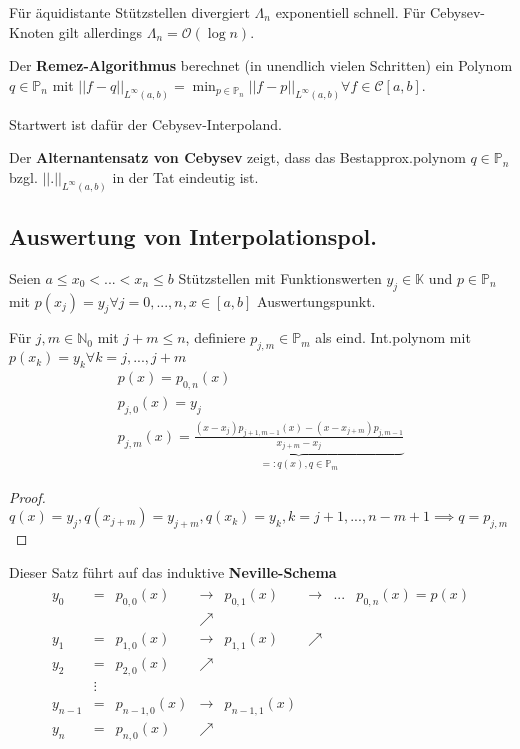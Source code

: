 \begin{remark}
	Für äquidistante Stützstellen divergiert $\Lambda_n$ exponentiell schnell. Für Cebysev-Knoten gilt allerdings $\Lambda_n = \mathcal{O}(\log n)$.
\end{remark}

\begin{remark}
	Der \textbf{Remez-Algorithmus} berechnet (in unendlich vielen Schritten) ein Polynom $q \in \mathbb{P}_n$ mit $||f-q||_{L^\infty(a,b)} = \min_{p \in \mathbb{P}_n} ||f-p||_{L^\infty(a,b)} \forall f\in\mathcal{C}[a,b]$.
	
	Startwert ist dafür der Cebysev-Interpoland.
	
	Der \textbf{Alternantensatz von Cebysev} zeigt, dass das Bestapprox.polynom $q \in \mathbb{P}_n$ bzgl. $||.||_{L^\infty(a,b)}$ in der Tat eindeutig ist.
\end{remark}

\subsection{Auswertung von Interpolationspol.}

\begin{theorem}
	Seien $a \leq x_0 < ... < x_n \leq b$ Stützstellen mit Funktionswerten $y_j \in \mathbb{K}$ und $p \in \mathbb{P}_n$ mit $p(x_j) = y_j \forall j=0, ..., n, x \in [a, b]$ Auswertungspunkt.
	
	Für $j,m \in \mathbb{N}_0$ mit $j + m \leq n$, definiere $p_{j,m} \in \mathbb{P}_m$ als eind. Int.polynom mit $p(x_k) = y_k \forall k=j, ..., j+m$
	\begin{align*}
		p(x) = p_{0, n}(x)\\
		p_{j,0}(x) = y_j\\
		p_{j,m}(x) = \underbrace{\frac{(x-x_j) p_{j+1, m-1}(x) - (x-x_{j+m}) p_{j,m-1}}{x_{j+m}-x_j}}_{=:q(x), q \in \mathbb{P}_m}
	\end{align*}
\end{theorem}

\begin{proof}
	$q(x) = y_j, q(x_{j+m}) = y_{j+m}, q(x_k) = y_k, k=j+1, ..., n-m+1 \implies q=p_{j,m}$
\end{proof}

Dieser Satz führt auf das induktive \textbf{Neville-Schema}
\begin{align*}
	\begin{matrix}
		y_0 &= & p_{0,0}(x) & \rightarrow & p_{0,1}(x) & \rightarrow & ... & p_{0,n}(x) = p(x)\\
		                 &  & & \nearrow    &            & & & \\
		y_1 &= & p_{1,0}(x) & \rightarrow & p_{1,1}(x) & \nearrow    & & \\
		y_2 &= & p_{2,0}(x) & \nearrow & & & \\
		&\vdots & & & & & \\
		y_{n-1} &= & p_{n-1,0}(x) & \rightarrow & p_{n-1,1}(x) & & \\
		y_n &= & p_{n,0}(x) & \nearrow & & & \\
	\end{matrix}
\end{align*}

